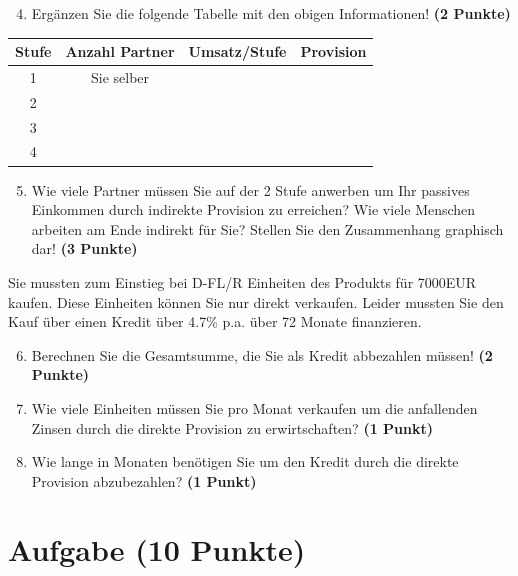 \documentclass[a4paper, 9pt]{scrartcl}\usepackage[]{graphicx}\usepackage[]{xcolor}
\begin{document}
\begin{enumerate}
  \setcounter{enumi}{3}
\item Erg{\"a}nzen Sie die folgende Tabelle mit den obigen Informationen! \textbf{(2 Punkte)}
\end{enumerate}

\begin{center}
\begin{tabular}{c|c|c|c}
  \toprule
  \textbf{Stufe} & \textbf{Anzahl Partner}  & \textbf{Umsatz/Stufe} & \textbf{Provision}\\
  \midrule
  1 & Sie selber  &  & \\ \midrule
  2 &   &  &  \\ \midrule
  3 &   &  &  \\ \midrule
  4 &   &  &  \\
  \bottomrule
\end{tabular}
\end{center}

\begin{enumerate}
  \setcounter{enumi}{4}
\item Wie viele Partner m{\"u}ssen Sie auf der 2 Stufe anwerben um Ihr passives
  Einkommen durch indirekte Provision zu erreichen? Wie viele Menschen
  arbeiten am Ende indirekt f{\"u}r Sie? Stellen Sie den
  Zusammenhang graphisch dar!  \textbf{(3 Punkte)}
\end{enumerate}

Sie mussten zum Einstieg bei D-FL/R Einheiten des Produkts
f{\"u}r 7000EUR kaufen. Diese Einheiten k{\"o}nnen Sie nur direkt
verkaufen. Leider mussten Sie den Kauf {\"u}ber einen Kredit {\"u}ber
4.7\% p.a. {\"u}ber 72 Monate finanzieren.

\begin{enumerate}
  \setcounter{enumi}{5}
\item Berechnen Sie die Gesamtsumme, die Sie als Kredit abbezahlen m{\"u}ssen! \textbf{(2 Punkte)}
\item Wie viele Einheiten m{\"u}ssen Sie pro Monat verkaufen um die anfallenden Zinsen
  durch die direkte Provision zu erwirtschaften? \textbf{(1 Punkt)}
\item Wie lange in
  Monaten ben{\"o}tigen Sie um den Kredit durch die direkte
  Provision abzubezahlen? \textbf{(1 Punkt)}
\end{enumerate} 
\clearpage

\section{Aufgabe \hfill (10 Punkte)}
\end{document}
